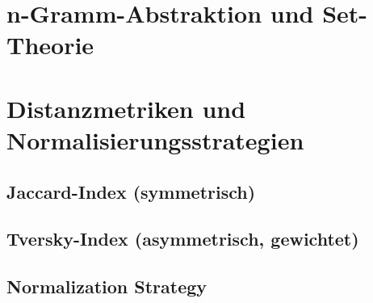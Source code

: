 \section{n-Gramm-Abstraktion und Set-Theorie}

 



\section{Distanzmetriken und Normalisierungsstrategien}

\subsection{Jaccard-Index (symmetrisch)}

\subsection{Tversky-Index (asymmetrisch, gewichtet)}

\subsection{Normalization Strategy}